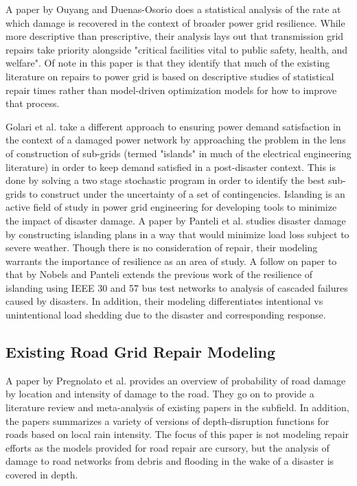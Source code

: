 \documentclass{article}
\begin{document}
		A paper by Ouyang and Duenas-Osorio \cite{OuyangEA2014} does a statistical analysis of the rate at which damage is recovered in the context of broader power grid resilience. While more descriptive than prescriptive, their analysis lays out that transmission grid repairs take priority alongside "critical facilities vital to public safety, health, and welfare". Of note in this paper is that they identify that much of the existing literature on repairs to power grid is based on descriptive studies of statistical repair times rather than model-driven optimization models for how to improve that process.
		
		Golari et al. \cite{GolariEA2014} take a different approach to ensuring power demand satisfaction in the context of a damaged power network by approaching the problem in the lens of construction of sub-grids (termed "islands" in much of the electrical engineering literature) in order to keep demand satisfied in a post-disaster context. This is done by solving a two stage stochastic program in order to identify the best sub-grids to construct under the uncertainty of a set of contingencies. Islanding is an active field of study in power grid engineering for developing tools to minimize the impact of disaster damage. A paper by Panteli et al. \cite{Panteli2016} studies disaster damage by constructing islanding plans in a way that would minimize load loss subject to severe weather. Though there is no consideration of repair, their modeling warrants the importance of resilience as an area of study.  A follow on paper to that by Nobels and Panteli \cite{NobelsEA2019} extends the previous work of the resilience of islanding using IEEE 30 and 57 bus test networks to analysis of cascaded failures caused by disasters. In addition, their modeling differentiates intentional vs unintentional load shedding due to the disaster and corresponding response.
	\subsection{Existing Road Grid Repair Modeling}
		A paper by Pregnolato et al. \cite{PregnolatoEA2017} provides an overview of probability of road damage by location and intensity of damage to the road. They go on to provide a literature review and meta-analysis of existing papers in the subfield. In addition, the papers summarizes a variety of versions of depth-disruption functions for roads based on local rain intensity. The focus of this paper is not modeling repair efforts as the models provided for road repair are cursory, but the analysis of damage to road networks from debris and flooding in the wake of a disaster is covered in depth.
		
\end{document}
